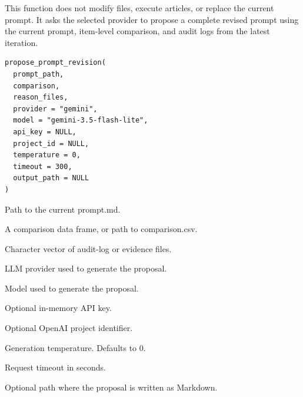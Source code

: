 \documentclass[a4paper]{book}
\begin{document}
%
\begin{Description}
This function does not modify files, execute articles, or replace the
current prompt. It asks the selected provider to propose a complete revised
prompt using the current prompt, item-level comparison, and audit logs from
the latest iteration.
\end{Description}
%
\begin{Usage}
\begin{verbatim}
propose_prompt_revision(
  prompt_path,
  comparison,
  reason_files,
  provider = "gemini",
  model = "gemini-3.5-flash-lite",
  api_key = NULL,
  project_id = NULL,
  temperature = 0,
  timeout = 300,
  output_path = NULL
)
\end{verbatim}
\end{Usage}
%
\begin{Arguments}
\begin{ldescription}
\item[\code{prompt\_path}] Path to the current prompt.md.

\item[\code{comparison}] A comparison data frame, or path to comparison.csv.

\item[\code{reason\_files}] Character vector of audit-log or evidence files.

\item[\code{provider}] LLM provider used to generate the proposal.

\item[\code{model}] Model used to generate the proposal.

\item[\code{api\_key}] Optional in-memory API key.

\item[\code{project\_id}] Optional OpenAI project identifier.

\item[\code{temperature}] Generation temperature. Defaults to 0.

\item[\code{timeout}] Request timeout in seconds.

\item[\code{output\_path}] Optional path where the proposal is written as Markdown.
\end{ldescription}
\end{Arguments}
\end{document}
